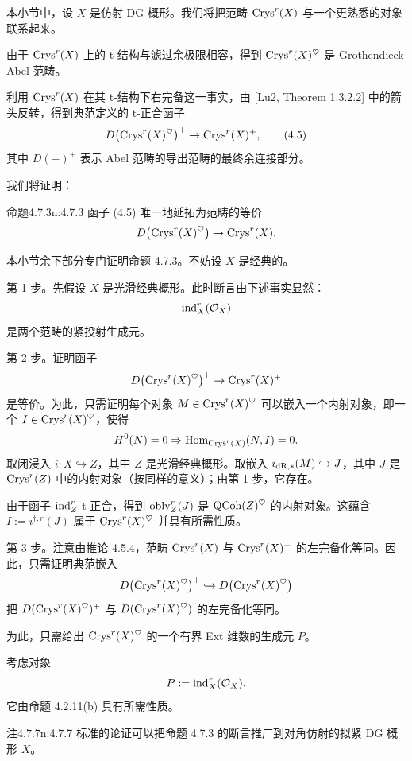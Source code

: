 本小节中，设 $X$ 是仿射 DG 概形。我们将把范畴 $\mathrm{Crys}^r(X)$ 与一个更熟悉的对象联系起来。

由于 $\mathrm{Crys}^r(X)$ 上的 t-结构与滤过余极限相容，得到 $\mathrm{Crys}^r(X)^{\heartsuit}$ 是 Grothendieck Abel 范畴。

利用 $\mathrm{Crys}^r(X)$ 在其 t-结构下右完备这一事实，由 [Lu2, Theorem 1.3.2.2] 中的箭头反转，得到典范定义的 t-正合函子
\begin{equation}
D\big(\mathrm{Crys}^r(X)^{\heartsuit}\big)^{+}\to\mathrm{Crys}^r(X)^{+},\tag{4.5}
\end{equation}
其中 $D(-)^{+}$ 表示 Abel 范畴的导出范畴的最终余连接部分。

我们将证明：

\begin{othm}{命题}{4.7.3}{n:4.7.3}
函子 (4.5) 唯一地延拓为范畴的等价
\[
D\big(\mathrm{Crys}^r(X)^{\heartsuit}\big)\to\mathrm{Crys}^r(X).
\]
\end{othm}

本小节余下部分专门证明命题 4.7.3。不妨设 $X$ 是经典的。

第 1 步。先假设 $X$ 是光滑经典概形。此时断言由下述事实显然：
\[
\mathrm{ind}^r_X(\mathcal{O}_X)
\]
是两个范畴的紧投射生成元。

第 2 步。证明函子
\[
D\big(\mathrm{Crys}^r(X)^{\heartsuit}\big)^{+}\to\mathrm{Crys}^r(X)^{+}
\]
是等价。为此，只需证明每个对象 $M\in\mathrm{Crys}^r(X)^{\heartsuit}$ 可以嵌入一个内射对象，即一个 $I\in\mathrm{Crys}^r(X)^{\heartsuit}$，使得
\[
H^0(N)=0\Rightarrow\mathrm{Hom}_{\mathrm{Crys}^r(X)}(N,I)=0.
\]
取闭浸入 $i:X\hookrightarrow Z$，其中 $Z$ 是光滑经典概形。取嵌入 $i_{\mathrm{dR},*}(M)\hookrightarrow J$，其中 $J$ 是 $\mathrm{Crys}^r(Z)$ 中的内射对象（按同样的意义）；由第 1 步，它存在。

由于函子 $\mathrm{ind}^r_Z$ t-正合，得到 $\mathrm{oblv}^r_Z(J)$ 是 $\mathrm{QCoh}(Z)^{\heartsuit}$ 的内射对象。这蕴含 $I:=i^{\dagger,r}(J)$ 属于 $\mathrm{Crys}^r(X)^{\heartsuit}$ 并具有所需性质。

第 3 步。注意由推论 4.5.4，范畴 $\mathrm{Crys}^r(X)$ 与 $\mathrm{Crys}^r(X)^{+}$ 的左完备化等同。因此，只需证明典范嵌入
\[
D\big(\mathrm{Crys}^r(X)^{\heartsuit}\big)^{+}\hookrightarrow D\big(\mathrm{Crys}^r(X)^{\heartsuit}\big)
\]
把 $D(\mathrm{Crys}^r(X)^{\heartsuit})^{+}$ 与 $D(\mathrm{Crys}^r(X)^{\heartsuit})$ 的左完备化等同。

为此，只需给出 $\mathrm{Crys}^r(X)^{\heartsuit}$ 的一个有界 Ext 维数的生成元 $P$。

考虑对象
\[
P:=\mathrm{ind}^r_X(\mathcal{O}_X).
\]
它由命题 4.2.11(b) 具有所需性质。

\begin{othm}{注}{4.7.7}{n:4.7.7}
标准的论证可以把命题 4.7.3 的断言推广到对角仿射的拟紧 DG 概形 $X$。
\end{othm}

